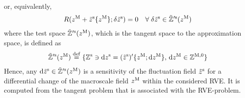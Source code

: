 \documentclass[12pt,a4paper]{article}
\renewcommand{\Box}{\mdlgwhtsquare}
\newcommand{\rve}{
  {\mathchoice
   {\mbox{\scalebox{0.67}{$\Box$}}}
   {\mbox{\scalebox{0.67}{$\Box$}}}
   {\mbox{\scalebox{0.5}{$\Box$}}}
   {\mbox{\scalebox{0.375}{$\Box$}}}
  }
}
\begin{document}
or, equivalently,
\begin{align}
\label{eq:A6b} R(z^{\mathrm{M}} + \tilde z^{\mathrm{s}}\{z^{\mathrm{M}}\}; \delta\tilde{z}^{\mathrm{s}}) = 0\quad \forall\;\delta \tilde{z}^{\mathrm{s}}\in\tilde{\mathbb{Z}}'^{\mathrm{s}}(z^{\mathrm{M}})
\end{align}
where the test space $\tilde{\mathbb{Z}}'^{\mathrm{s}}(z^{\mathrm{M}})$, which is the tangent space to the approximation space, is defined as
\begin{align}
    \tilde{\mathbb{Z}}'^{\mathrm{s}}(z^{\mathrm{M}})\overset{\mathrm{def}}{=}\{\mathbb{Z}^{\mathrm{s}}\ni \operatorname{d \!} z^{\mathrm{s}} = (\tilde{z}^{\mathrm{s}})'\{z^{\mathrm{M}};\operatorname{d \!} z^{\mathrm{M}}\},\,
    \operatorname{d \!} z^{\mathrm{M}}\in \mathbb{Z}^{\mathrm{M},0}\}
\label{eq:A6c}
\end{align}
Hence, any $\operatorname{d \!} \tilde{z}^{\mathrm{s}}\in\tilde{\mathbb{Z}}'^{\mathrm{s}}(z^{\mathrm{M}})$ is a sensitivity of the fluctuation field $\tilde{z}^{\mathrm{s}}$ for a differential change of the macroscale field $z^{\mathrm{M}}$ within the considered RVE.
It is computed from the tangent problem that is associated with the RVE-problem.
\end{document}
